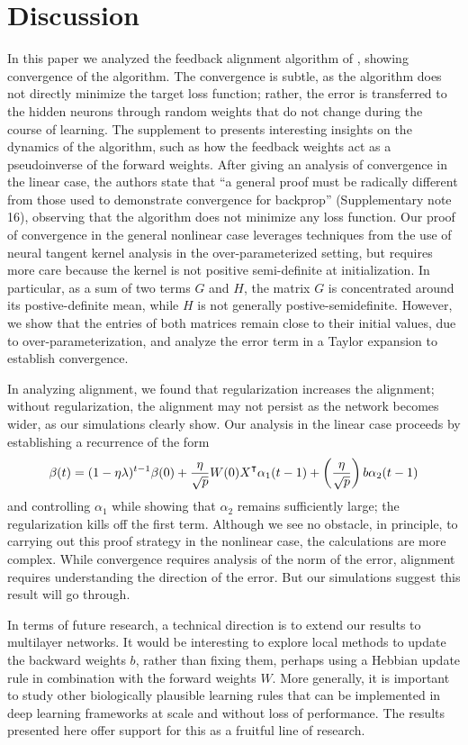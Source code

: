 \section{Discussion}

In this paper we analyzed the feedback alignment algorithm of
\cite{lillicrap2016random}, showing convergence of the algorithm. The convergence is subtle, as the algorithm does not directly minimize the target loss function; rather, the error is transferred to the hidden neurons through random weights that do not change during the course of learning.
The supplement to \cite{lillicrap2016random} presents interesting insights on the dynamics of the algorithm, such as how the feedback weights act as a pseudoinverse of the forward weights. After giving an analysis of convergence in the linear case, the authors state that
``a general proof must be radically different from those used to demonstrate convergence for backprop'' (Supplementary note 16), observing that the algorithm does not minimize any loss function. Our proof of convergence in the general nonlinear case leverages techniques from
the use of neural tangent kernel analysis in the over-parameterized setting, but requires more care because the kernel is not positive semi-definite at initialization. In particular, as a sum of two terms $G$ and $H$, the matrix $G$ is concentrated around its postive-definite mean, while $H$ is not generally postive-semidefinite. However, we show that the entries of both matrices remain close to their initial values, due to over-parameterization, and analyze the error term in a Taylor expansion to establish convergence.

In analyzing alignment, we found that regularization increases the alignment; without regularization, the alignment may not persist as the network becomes wider, as our simulations clearly show.
Our analysis in the linear case proceeds by establishing a recurrence of the form
$$\beta(t) = (1-\eta \lambda)^{t-1} \beta(0) + \frac{\eta}{\sqrt{p}} W(0) X\transpose \alpha_1(t-1) +
\left(\frac{\eta}{\sqrt{p}} \right) b \alpha_2(t-1)$$
and controlling $\alpha_1$ while showing that $\alpha_2$ remains sufficiently large; the
regularization kills off the first term.
Although we see no obstacle, in principle, to carrying out this proof strategy in the nonlinear
case, the calculations are more complex. While convergence requires analysis of the norm of the error, alignment requires understanding the direction of the error. But our simulations suggest this result will go through.

In terms of future research, a technical direction is to extend our results to multilayer networks. It would be interesting to explore local methods to update the backward weights $b$, rather than fixing them, perhaps using a Hebbian update rule in combination with the forward weights $W$. More generally, it is important to study other biologically plausible learning rules that can be implemented in deep learning frameworks at scale and without loss of performance.  The results presented here offer support for this as a fruitful line of research. 

